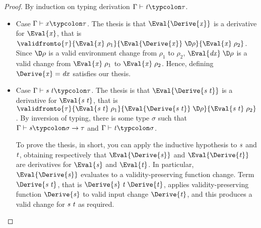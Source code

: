 \begin{proof}
  By induction on typing derivation \ensuremath{\Gamma\vdash\Varid{t}\typcolon\tau}.
  \begin{itemize}
  \item Case \ensuremath{\Gamma\vdash\Varid{x}\typcolon\tau}. The thesis is that \ensuremath{\Eval{\Derive{\Varid{x}}}}
    is a derivative for \ensuremath{\Eval{\Varid{x}}}, that is \ensuremath{\validfromto{\tau}{\Eval{\Varid{x}}\;\rho_{1}}{\Eval{\Derive{\Varid{x}}}\;\D\rho}{\Eval{\Varid{x}}\;\rho_{2}}}.
    Since \ensuremath{\D\rho} is a valid environment change
    from \ensuremath{\rho_{1}} to \ensuremath{\rho_{2}}, \ensuremath{\Eval{\Varid{dx}}\;\D\rho} is a valid change
    from \ensuremath{\Eval{\Varid{x}}\;\rho_{1}} to \ensuremath{\Eval{\Varid{x}}\;\rho_{2}}. Hence, defining \ensuremath{\Derive{\Varid{x}}\mathrel{=}\Varid{dx}} satisfies our thesis.
  \item Case \ensuremath{\Gamma\vdash\Varid{s}\;\Varid{t}\typcolon\tau}.
    The thesis is that \ensuremath{\Eval{\Derive{\Varid{s}\;\Varid{t}}}} is a derivative for \ensuremath{\Eval{\Varid{s}\;\Varid{t}}}, that is
    \ensuremath{\validfromto{\tau}{\Eval{\Varid{s}\;\Varid{t}}\;\rho_{1}}{\Eval{\Derive{\Varid{s}\;\Varid{t}}}\;\D\rho}{\Eval{\Varid{s}\;\Varid{t}}\;\rho_{2}}}.
    By inversion of typing, there is some type \ensuremath{\sigma} such that
    \ensuremath{\Gamma\vdash\Varid{s}\typcolon\sigma\to \tau} and \ensuremath{\Gamma\vdash\Varid{t}\typcolon\sigma}.

    To prove the thesis, in short, you can apply the inductive
    hypothesis to \ensuremath{\Varid{s}} and \ensuremath{\Varid{t}},
    obtaining respectively that \ensuremath{\Eval{\Derive{\Varid{s}}}} and \ensuremath{\Eval{\Derive{\Varid{t}}}}
    are derivatives for \ensuremath{\Eval{\Varid{s}}} and \ensuremath{\Eval{\Varid{t}}}. In particular, \ensuremath{\Eval{\Derive{\Varid{s}}}}
    evaluates to a validity-preserving function change.
    Term \ensuremath{\Derive{\Varid{s}\;\Varid{t}}}, that is \ensuremath{\Derive{\Varid{s}}\;\Varid{t}\;\Derive{\Varid{t}}}, applies
    validity-preserving function \ensuremath{\Derive{\Varid{s}}} to valid
    input change \ensuremath{\Derive{\Varid{t}}}, and this produces a valid change for
    \ensuremath{\Varid{s}\;\Varid{t}} as required.


\end{itemize}
\end{proof}
